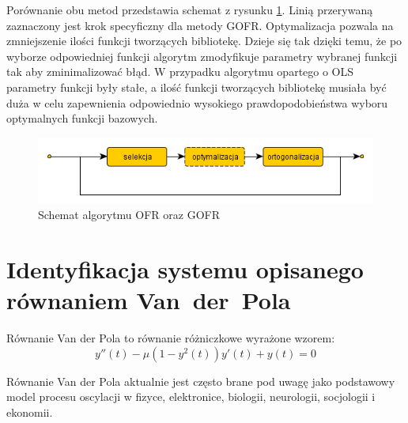 Porównanie obu metod przedstawia schemat z rysunku \ref{ofr_and_gofr}. Linią przerywaną zaznaczony jest krok specyficzny dla metody GOFR. Optymalizacja pozwala na zmniejszenie ilości funkcji tworzących bibliotekę. Dzieje się tak dzięki temu, że po wyborze odpowiedniej funkcji algorytm zmodyfikuje parametry wybranej funkcji tak aby zminimalizować błąd. W przypadku algorytmu opartego o OLS parametry funkcji były stałe, a ilość funkcji tworzących bibliotekę musiała być duża w celu zapewnienia odpowiednio wysokiego prawdopodobieństwa wyboru optymalnych funkcji bazowych.

\begin{figure}[ht!]
	\centering
	
	\includegraphics[scale=0.7]{images/ofr_and_gofr.png}
	\caption{Schemat algorytmu OFR oraz GOFR}
	\label{ofr_and_gofr}	

\end{figure}

\clearpage
\section{Identyfikacja systemu opisanego równaniem \mbox{Van der Pola}}

Równanie Van der Pola to równanie różniczkowe wyrażone wzorem:
\begin{equation}
	\label{wzor:van_der_pol}
	y''(t) - \mu(1 - y^2(t))y'(t) + y(t) = 0
\end{equation}

Równanie Van der Pola aktualnie jest często brane pod uwagę jako podstawowy model procesu oscylacji w fizyce, elektronice, biologii, neurologii, socjologii i ekonomii\cite{Tsatsos}.

